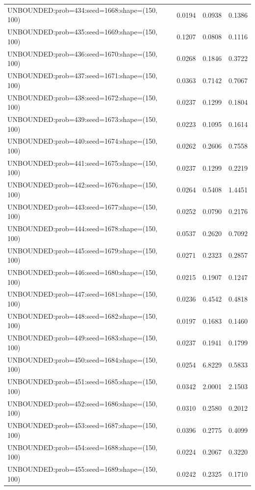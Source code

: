 \begin{longtable}{lccc}
UNBOUNDED:prob=434:seed=1668:shape=(150, 100) &   0.0194 &  0.0938 &  0.1386 \\
UNBOUNDED:prob=435:seed=1669:shape=(150, 100) &   0.1207 &  0.0808 &  0.1116 \\
UNBOUNDED:prob=436:seed=1670:shape=(150, 100) &   0.0268 &  0.1846 &  0.3722 \\
UNBOUNDED:prob=437:seed=1671:shape=(150, 100) &   0.0363 &  0.7142 &  0.7067 \\
UNBOUNDED:prob=438:seed=1672:shape=(150, 100) &   0.0237 &  0.1299 &  0.1804 \\
UNBOUNDED:prob=439:seed=1673:shape=(150, 100) &   0.0223 &  0.1095 &  0.1614 \\
UNBOUNDED:prob=440:seed=1674:shape=(150, 100) &   0.0262 &  0.2606 &  0.7558 \\
UNBOUNDED:prob=441:seed=1675:shape=(150, 100) &   0.0237 &  0.1299 &  0.2219 \\
UNBOUNDED:prob=442:seed=1676:shape=(150, 100) &   0.0264 &  0.5408 &  1.4451 \\
UNBOUNDED:prob=443:seed=1677:shape=(150, 100) &   0.0252 &  0.0790 &  0.2176 \\
UNBOUNDED:prob=444:seed=1678:shape=(150, 100) &   0.0537 &  0.2620 &  0.7092 \\
UNBOUNDED:prob=445:seed=1679:shape=(150, 100) &   0.0271 &  0.2323 &  0.2857 \\
UNBOUNDED:prob=446:seed=1680:shape=(150, 100) &   0.0215 &  0.1907 &  0.1247 \\
UNBOUNDED:prob=447:seed=1681:shape=(150, 100) &   0.0236 &  0.4542 &  0.4818 \\
UNBOUNDED:prob=448:seed=1682:shape=(150, 100) &   0.0197 &  0.1683 &  0.1460 \\
UNBOUNDED:prob=449:seed=1683:shape=(150, 100) &   0.0237 &  0.1941 &  0.1799 \\
UNBOUNDED:prob=450:seed=1684:shape=(150, 100) &   0.0254 &  6.8229 &  0.5833 \\
UNBOUNDED:prob=451:seed=1685:shape=(150, 100) &   0.0342 &  2.0001 &  2.1503 \\
UNBOUNDED:prob=452:seed=1686:shape=(150, 100) &   0.0310 &  0.2580 &  0.2012 \\
UNBOUNDED:prob=453:seed=1687:shape=(150, 100) &   0.0396 &  0.2775 &  0.4099 \\
UNBOUNDED:prob=454:seed=1688:shape=(150, 100) &   0.0224 &  0.2067 &  0.3220 \\
UNBOUNDED:prob=455:seed=1689:shape=(150, 100) &   0.0242 &  0.2325 &  0.1710 \\

\end{longtable}
